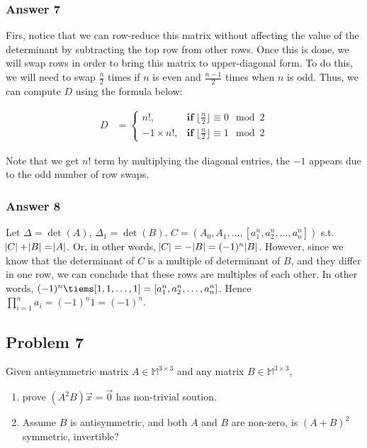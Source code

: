 \documentclass[11pt]{article}
\DeclareMathOperator{\det}{det}
\begin{document}
\subsubsection{Answer 7}
\label{sec:orgheadline12}
Firs, notice that we can row-reduce this matrix without affecting the value
of the determinant by subtracting the top row from other rows.  Once this is
done, we will swap rows in order to bring this matrix to upper-diagonal
form.  To do this, we will need to swap \(\frac{n}{2}\) times if \(n\) is even
and \(\frac{n-1}{2}\) times when \(n\) is odd.  Thus, we can compute \(D\) using
the formula below:

\begin{align*}
  D &= \begin{cases}
    n!,          &\textbf{if}\; \lfloor \frac{n}{2} \rfloor \equiv 0 \mod 2 \\
    -1\times n!, &\textbf{if}\; \lfloor \frac{n}{2} \rfloor \equiv 1 \mod 2
  \end{cases}
\end{align*}

Note that we get \(n!\) term by multiplying the diagonal entries, the \(-1\)
appears due to the odd number of row swaps.

\subsubsection{Answer 8}
\label{sec:orgheadline13}
Let \(\Delta = \det(A)\), \(\Delta_1 = \det(B)\), \(C = (A_0, A_1, \dots, [a_1^n,
    a_2^n, \dots, a_n^n])\) s.t. \(\abs{C} + \abs{B} = \abs{A}\).  Or, in other
words, \(\abs{C} = -\abs{B} = (-1)^n\abs{B}\).  However, since we know that
the determinant of \(C\) is a multiple of determinant of \(B\), and they differ
in one row, we can conclude that these rows are multiples of each other.  In
other words, \((-1)^n \tiems [1, 1, \dots, 1] = [a^n_1, a^n_2, \dots,
    a^n_n]\).  Hence \(\prod_{i = 1}^n a_i = (-1)^n1 = (-1)^n\).

\subsection{Problem 7}
\label{sec:orgheadline17}
Given antisymmetric matrix \(A \in \mathbb{M}^{3\times 3}\) and any matrix \(B
   \in \mathbb{M}^{3\times 3}\), 

\begin{enumerate}
\item prove \((A^2B)\vec{x} = \vec{0}\) has non-trivial soution.
\item Assume \(B\) is antisymmetric, and both \(A\) and \(B\) are non-zero, is \((A +
      B)^2\) symmetric, invertible?
\end{enumerate}
\end{document}
